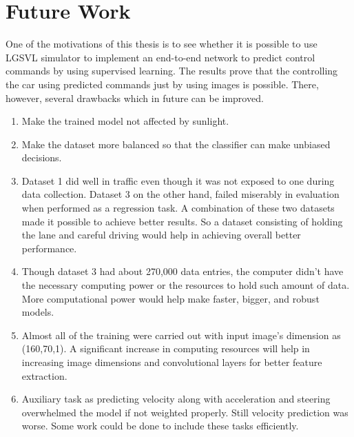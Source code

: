 \chapter{Future Work}
One of the motivations of this thesis is to see whether it is possible to use LGSVL
simulator to implement an end-to-end network to predict control commands by using
supervised learning. The results prove that the controlling the car using predicted
commands just by using images is possible.
There, however, several drawbacks which in future can be improved.
\begin{enumerate}
    \item Make the trained model not affected by sunlight.
    \item Make the dataset more balanced so that the classifier can make unbiased
        decisions.
    \item Dataset 1 did well in traffic even though it was not exposed to one during data
        collection. Dataset 3 on the other hand, failed miserably in evaluation when
        performed as a regression task. A combination of these two datasets made it
        possible to achieve better results. So a dataset consisting of holding the lane
        and careful driving would help in achieving overall better performance.
    \item Though dataset 3 had about 270,000 data entries, the computer didn't have the
        necessary computing power or the resources to hold such amount of data. More
        computational power would help make faster, bigger, and robust models.
    \item Almost all of the training were carried out with input image's dimension as
        (160,70,1). A significant increase in computing resources will help in increasing
        image dimensions and convolutional layers for better feature extraction.
    \item Auxiliary task as predicting velocity along with acceleration and steering
        overwhelmed the model if not weighted properly. Still velocity prediction was
        worse. Some work could be done to include these tasks efficiently.
\end{enumerate}

